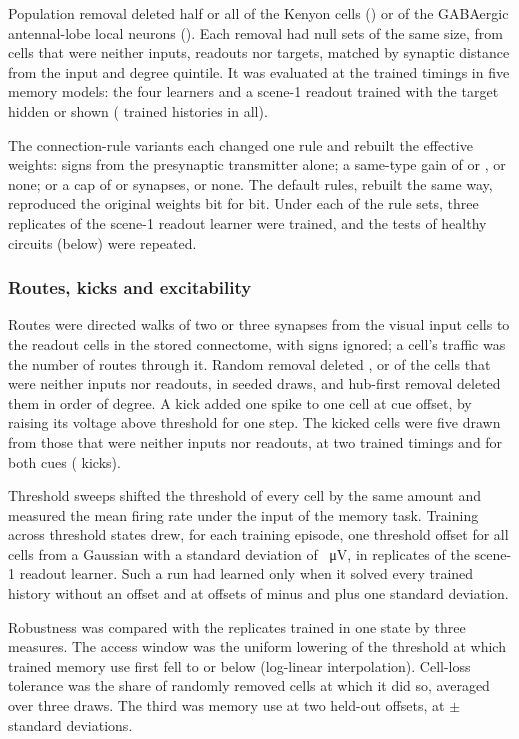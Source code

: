 Population removal deleted half or all of the Kenyon cells () or of the GABAergic antennal-lobe local neurons
(). Each removal had  null sets of the same size, from cells that were neither inputs, readouts nor
targets, matched by synaptic distance from the input and degree quintile. It was evaluated at the trained timings in five memory
models: the four learners and a scene-1 readout trained with the target hidden or shown ( trained histories in all).

The connection-rule variants each changed one rule and rebuilt the effective weights: signs from the presynaptic transmitter
alone; a same-type gain of  or , or none; or a cap of  or  synapses, or none.
The default rules, rebuilt the same way, reproduced the original weights bit for bit. Under each of the  rule sets,
three replicates of the scene-1 readout learner were trained, and the tests of healthy circuits (below) were repeated.

\subsubsection{Routes, kicks and excitability}

Routes were directed walks of two or three synapses from the visual input cells to the readout cells in the stored connectome,
with signs ignored; a cell's traffic was the number of routes through it. Random removal deleted ,  or
 of the cells that were neither inputs nor readouts, in seeded draws, and hub-first removal deleted them in order of
degree. A kick added one spike to one cell at cue offset, by raising its voltage above threshold for one step. The kicked cells were five drawn from those that were neither inputs nor readouts, at two trained timings and for both
cues ( kicks).

Threshold sweeps shifted the threshold of every cell by the same amount and measured the mean firing rate under the input of
the memory task. Training across threshold states drew, for each training episode, one threshold offset for all cells from a
Gaussian with a standard deviation of ~μV, in  replicates of the scene-1 readout learner. Such a run had
learned only when it solved every trained history without an offset and at offsets of minus and plus one standard deviation.

Robustness was compared with the  replicates trained in one state by three measures. The access window was the uniform
lowering of the threshold at which trained memory use first fell to  or below (log-linear interpolation). Cell-loss
tolerance was the share of randomly removed cells at which it did so, averaged over three draws. The third was memory use at
two held-out offsets, at $\pm$ standard deviations.

